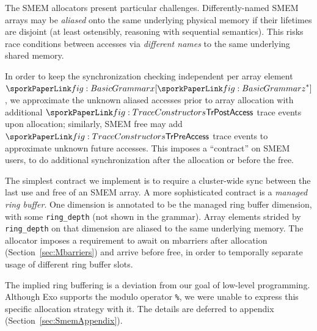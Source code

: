 
The SMEM allocators present particular challenges.
Differently-named SMEM arrays may be \emph{aliased} onto the same underlying physical memory if their lifetimes are disjoint
(at least ostensibly, reasoning with sequential semantics).
This risks race conditions between accesses via \emph{different names} to the same underlying shared memory.

In order to keep the synchronization checking independent per array element $\sporkx[\sporkz^*]$,
we approximate the unknown aliased accesses prior to array allocation with additional
$\sporkTrPostAccess$ trace events upon allocation;
similarly, SMEM free may add $\sporkTrPreAccess$ trace events to approximate unknown future accesses.
This imposes a ``contract'' on SMEM users,
to do additional synchronization after the allocation or before the free.

The simplest contract we implement is to require a cluster-wide sync
between the last use and free of an SMEM array.
A more sophisticated contract is a \emph{managed ring buffer}.
One dimension is annotated to be the managed ring buffer dimension,
with some \texttt{ring\_depth} (not shown in the grammar).
Array elements strided by \texttt{ring\_depth} on that dimension are aliased to the same underlying memory.
The allocator imposes a requirement to await on mbarriers after allocation (Section~\ref{sec:Mbarriers}) and arrive before free,
in order to temporally separate usage of different ring buffer slots.

The implied ring buffering is a deviation from our goal of low-level programming.
Although Exo supports the modulo operator \texttt{\%},
we were unable to express this specific allocation strategy with it.
The details are deferred to appendix (Section~\ref{sec:SmemAppendix}).

